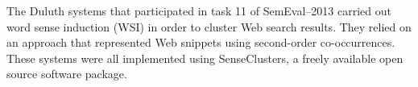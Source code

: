 The Duluth systems that participated in task 11 of SemEval--2013 carried out word sense induction (WSI) in order to cluster Web search results. They relied
 on an approach that represented Web snippets using second-order co-occurrences.
 These systems were all implemented using SenseClusters, a freely available open
 source software package.

